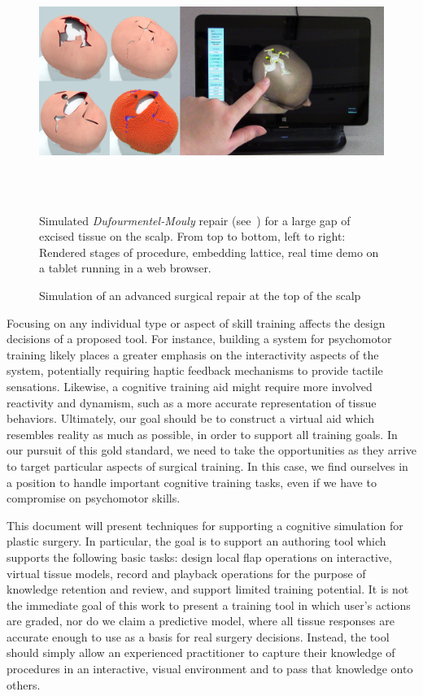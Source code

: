 \begin{figure}
  \includegraphics[height=2.99in]{chapter_gridiron/images/TitleImage.png}
  \vspace*{-.05in}
  \caption{Simulation of an advanced surgical repair at the top of the
    scalp}{Simulated \textit{Dufourmentel-Mouly} repair (see\
    \protect\cite{Baker:2014}) for a large gap of excised tissue on
    the scalp. From top to bottom, left to right: Rendered stages of
    procedure, embedding lattice, real time demo on a tablet running
    in a web browser.}
  \vspace*{-.05in}
  \label{fig:gridiron-teaser}
\end{figure}

Focusing on any individual type or aspect of skill training affects
the design decisions of a proposed tool. For instance, building a
system for psychomotor training likely places a greater emphasis on
the interactivity aspects of the system, potentially requiring haptic
feedback mechanisms to provide tactile sensations. Likewise, a
cognitive training aid might require more involved reactivity and
dynamism, such as a more accurate representation of tissue
behaviors. Ultimately, our goal should be to construct a virtual aid
which resembles reality as much as possible, in order to support all
training goals. In our pursuit of this gold standard, we need to take
the opportunities as they arrive to target particular aspects of
surgical training. In this case, we find ourselves in a position to
handle important cognitive training tasks, even if we have to
compromise on psychomotor skills.

This document will present techniques for supporting a cognitive
simulation for plastic surgery. In particular, the goal is to support
an authoring tool which supports the following basic tasks: design
local flap operations on interactive, virtual tissue models, record
and playback operations for the purpose of knowledge retention and
review, and support limited training potential. It is not the
immediate goal of this work to present a training tool in which user's
actions are graded, nor do we claim a predictive model, where all
tissue responses are accurate enough to use as a basis for real
surgery decisions. Instead, the tool should simply allow an
experienced practitioner to capture their knowledge of procedures in
an interactive, visual environment and to pass that knowledge onto
others.


